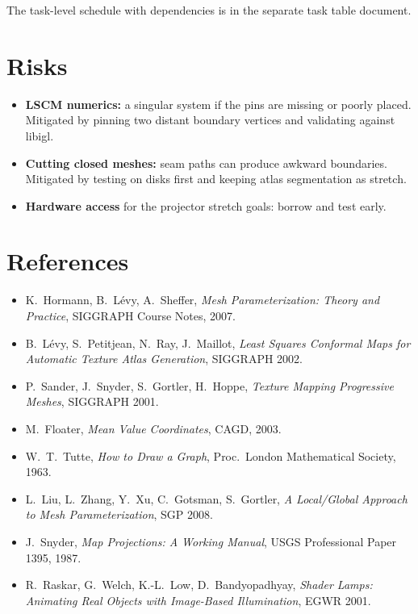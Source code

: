 \documentclass[11pt]{article}
\begin{document}
\medskip
\noindent The task-level schedule with dependencies is in the separate task table document.

\section{Risks}
\begin{itemize}
  \item \textbf{LSCM numerics:} a singular system if the pins are missing or poorly placed. Mitigated by pinning two
        distant boundary vertices and validating against libigl.
  \item \textbf{Cutting closed meshes:} seam paths can produce awkward boundaries. Mitigated by testing on disks
        first and keeping atlas segmentation as stretch.
  \item \textbf{Hardware access} for the projector stretch goals: borrow and test early.
\end{itemize}

\section*{References}
\begin{itemize}
  \item K.~Hormann, B.~Lévy, A.~Sheffer, \emph{Mesh Parameterization: Theory and Practice}, SIGGRAPH Course Notes,
        2007.
  \item B.~Lévy, S.~Petitjean, N.~Ray, J.~Maillot, \emph{Least Squares Conformal Maps for Automatic Texture Atlas
        Generation}, SIGGRAPH 2002.
  \item P.~Sander, J.~Snyder, S.~Gortler, H.~Hoppe, \emph{Texture Mapping Progressive Meshes}, SIGGRAPH 2001.
  \item M.~Floater, \emph{Mean Value Coordinates}, CAGD, 2003.
  \item W.~T.~Tutte, \emph{How to Draw a Graph}, Proc.\ London Mathematical Society, 1963.
  \item L.~Liu, L.~Zhang, Y.~Xu, C.~Gotsman, S.~Gortler, \emph{A Local/Global Approach to Mesh Parameterization},
        SGP 2008.
  \item J.~Snyder, \emph{Map Projections: A Working Manual}, USGS Professional Paper 1395, 1987.
  \item R.~Raskar, G.~Welch, K.-L.~Low, D.~Bandyopadhyay, \emph{Shader Lamps: Animating Real Objects with
        Image-Based Illumination}, EGWR 2001.
\end{itemize}
\end{document}
